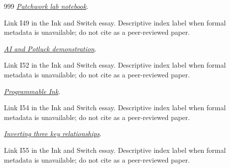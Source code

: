 \documentclass[11pt,letterpaper]{article}
\begin{document}
\begin{thebibliography}{999}
\href{https://www.inkandswitch.com/patchwork/notebook/}{\emph{Patchwork lab notebook}}.
\par {\small Link I49 in the Ink and Switch essay. Descriptive index label when formal metadata is unavailable; do not cite as a peer-reviewed paper.}

\href{https://www.youtube.com/watch?v=bJ3i4K3hefI}{\emph{AI and Potluck demonstration}}.
\par {\small Link I52 in the Ink and Switch essay. Descriptive index label when formal metadata is unavailable; do not cite as a peer-reviewed paper.}

\href{https://www.inkandswitch.com/ink/}{\emph{Programmable Ink}}.
\par {\small Link I54 in the Ink and Switch essay. Descriptive index label when formal metadata is unavailable; do not cite as a peer-reviewed paper.}

\href{https://www.wildbuilt.world/p/inverting-three-key-relationships}{\emph{Inverting three key relationships}}.
\par {\small Link I55 in the Ink and Switch essay. Descriptive index label when formal metadata is unavailable; do not cite as a peer-reviewed paper.}

\end{thebibliography}
\end{document}

